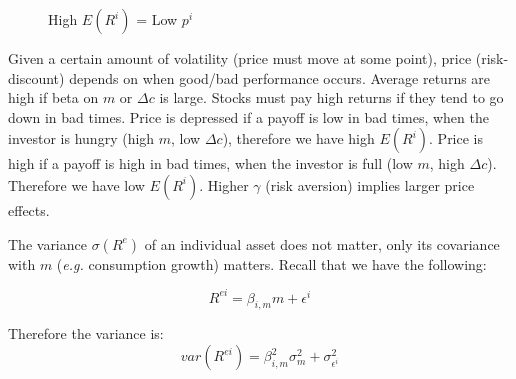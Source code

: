 \begin{figure}[htbp]
    \centering
    \caption{High $E(R^i)$ = Low $p^i$}
    \label{fig:asset_pricing}
\end{figure}

Given a certain amount of volatility (price must move at some point),
price (risk-discount) depends on when good/bad performance occurs.
Average returns are high if beta on $m$ or $\Delta c$ is large.
Stocks must pay high returns if they tend to go down 
in bad times. Price is depressed if a payoff is low in 
bad times, when the investor is hungry (high $m$, low $\Delta c$), 
therefore we have high $E(R^i)$.
Price is high if a payoff is high in bad times, when the investor
is full (low $m$, high $\Delta c$). Therefore we have low $E(R^i)$.
Higher $\gamma$ (risk aversion) implies larger price effects.

The variance $\sigma(R^e)$ of an individual asset 
does not matter, only its covariance with $m$ (\textit{e.g.} consumption growth)
matters. Recall that we have the following:

\begin{equation}
    R^{ei} = \beta_{i,m} m + \epsilon^i 
\end{equation}

Therefore the variance is:
\begin{equation}
    var(R^{ei}) = \beta^2_{i,m} \sigma^2_{m} + \sigma_{\epsilon^i}^2
\end{equation}

